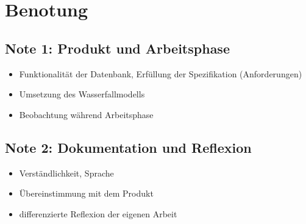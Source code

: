 {\section{Benotung}
\subsection{Note 1: Produkt und Arbeitsphase}
\begin{itemize}
    \item Funktionalität der Datenbank, Erfüllung der Spezifikation (Anforderungen)
    \item Umsetzung des Wasserfallmodells
    \item Beobachtung während Arbeitsphase
\end{itemize}

\subsection{Note 2: Dokumentation und Reflexion}
\begin{itemize}
    \item Verständlichkeit, Sprache
    \item Übereinstimmung mit dem Produkt
    \item differenzierte Reflexion der eigenen Arbeit
\end{itemize}
}